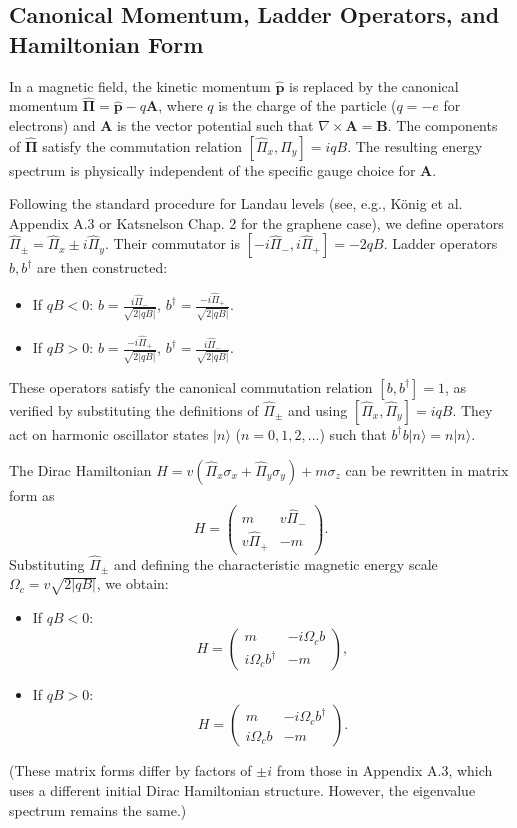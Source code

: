 \documentclass[11pt]{article}
\begin{document}
\subsection{Canonical Momentum, Ladder Operators, and Hamiltonian Form}
In a magnetic field, the kinetic momentum $\hat{\mathbf{p}}$ is replaced by the canonical momentum $\hat{\mathbf{\Pi}} = \hat{\mathbf{p}} - q\mathbf{A}$, where $q$ is the charge of the particle ($q=-e$ for electrons) and $\mathbf{A}$ is the vector potential such that $\nabla \times \mathbf{A} = \mathbf{B}$. The components of $\hat{\mathbf{\Pi}}$ satisfy the commutation relation $[\hat{\Pi}_x, \hat{\Pi}_y] = i q B$. The resulting energy spectrum is physically independent of the specific gauge choice for $\mathbf{A}$.

Following the standard procedure for Landau levels (see, e.g., König et al. \cite{PhysRevB.88.035106} Appendix A.3 or Katsnelson \cite{Katsnelson2012Graphene} Chap. 2 for the graphene case), we define operators $\hat{\Pi}_{\pm} = \hat{\Pi}_x \pm i \hat{\Pi}_y$. Their commutator is $[-i \hat{\Pi}_-, i \hat{\Pi}_+] = -2qB$.
Ladder operators $b, b^\dagger$ are then constructed:
\begin{itemize}
    \item If $qB < 0$: $b = \frac{i \hat{\Pi}_-}{\sqrt{2|qB|}}$, $b^\dagger = \frac{-i \hat{\Pi}_+}{\sqrt{2|qB|}}$.
    \item If $qB > 0$: $b = \frac{-i \hat{\Pi}_+}{\sqrt{2|qB|}}$, $b^\dagger = \frac{i \hat{\Pi}_-}{\sqrt{2|qB|}}$.
\end{itemize}
These operators satisfy the canonical commutation relation $[b, b^\dagger]=1$, as verified by substituting the definitions of $\hat{\Pi}_{\pm}$ and using $[\hat{\Pi}_x, \hat{\Pi}_y]=iqB$. They act on harmonic oscillator states $|n\rangle$ ($n=0, 1, 2, ...$) such that $b^\dagger b |n\rangle = n |n\rangle$.

The Dirac Hamiltonian $H = v(\hat{\Pi}_x \sigma_x + \hat{\Pi}_y \sigma_y) + m \sigma_z$ can be rewritten in matrix form as 
$$H = \begin{pmatrix} m & v \hat{\Pi}_- \\ v \hat{\Pi}_+ & -m \end{pmatrix}.$$
Substituting $\hat{\Pi}_{\pm}$ and defining the characteristic magnetic energy scale $\Omega_c = v \sqrt{2|qB|}$, we obtain:
\begin{itemize}
    \item If $qB < 0$: \[H = \begin{pmatrix} m & -i \Omega_c b \\ i \Omega_c b^\dagger & -m \end{pmatrix},\]
    \item If $qB > 0$: \[H = \begin{pmatrix} m & -i \Omega_c b^\dagger \\ i \Omega_c b & -m \end{pmatrix}.\]
\end{itemize}
(These matrix forms differ by factors of $\pm i$ from those in \cite{PhysRevB.88.035106} Appendix A.3, which uses a different initial Dirac Hamiltonian structure. However, the eigenvalue spectrum remains the same.)
\end{document}
